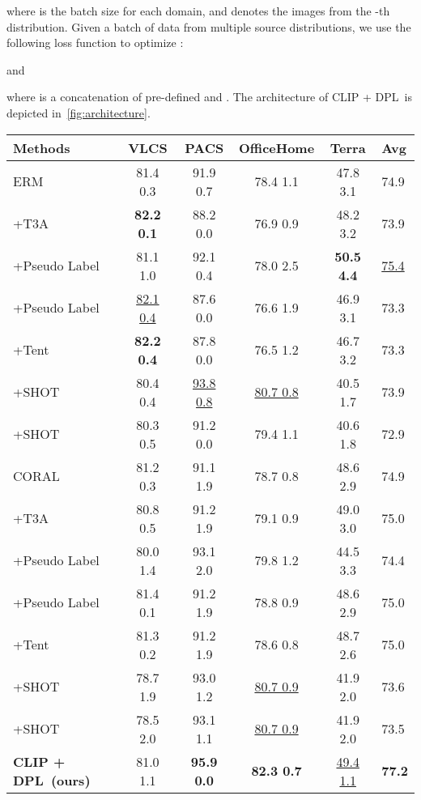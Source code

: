\documentclass[letterpaper]{article} \usepackage[]{aaai23}
\newcommand{\dplshort}{DPL}
\begin{document}
where  is the batch size for each domain, and  denotes the images from the -th distribution. 
Given a batch of data from multiple source distributions, we use the following loss function to optimize :

and 

where   is a concatenation of pre-defined  and  . 
The architecture of CLIP + \dplshort~is depicted in~\autoref{fig:architecture}.

\begin{table*}[t]
\begin{center}
\begin{tabular}{l|cccc|l}
\toprule
\textbf{Methods} & \textbf{VLCS} & \textbf{PACS} & \textbf{OfficeHome} & \textbf{Terra} & \textbf{Avg} \\
\midrule
ERM & 81.4  0.3 & 91.9  0.7 & 78.4  1.1 & 47.8  3.1 & 74.9 \\
+T3A & \textbf{82.2  0.1} & 88.2  0.0 & 76.9  0.9 & 48.2  3.2 & 73.9 \\
+Pseudo Label   & 81.1  1.0 & 92.1  0.4 & 78.0  2.5 & \textbf{50.5  4.4} & \underline{75.4} \\
+Pseudo Label & \underline{82.1  0.4} & 87.6  0.0 & 76.6  1.9 & 46.9  3.1 & 73.3 \\
+Tent & \textbf{82.2  0.4} & 87.8  0.0 & 76.5  1.2 & 46.7  3.2 & 73.3 \\
+SHOT & 80.4  0.4 & \underline{93.8  0.8} & \underline{80.7  0.8} & 40.5  1.7 & 73.9 \\
+SHOT & 80.3  0.5 & 91.2  0.0 & 79.4  1.1 & 40.6  1.8 & 72.9 \\
\midrule
CORAL & 81.2  0.3 & 91.1  1.9 & 78.7  0.8 & 48.6  2.9 & 74.9 \\
+T3A & 80.8  0.5 & 91.2  1.9 & 79.1  0.9 & 49.0  3.0 & 75.0 \\
+Pseudo Label  & 80.0  1.4 & 93.1  2.0 & 79.8  1.2 & 44.5  3.3 & 74.4 \\
+Pseudo Label & 81.4  0.1 & 91.2  1.9 & 78.8  0.9 & 48.6  2.9 & 75.0           \\
+Tent & 81.3  0.2 & 91.2  1.9 & 78.6  0.8 & 48.7  2.6 & 75.0           \\
+SHOT & 78.7  1.9 & 93.0  1.2 & \underline{80.7  0.9} & 41.9  2.0 & 73.6\\
+SHOT & 78.5  2.0 & 93.1  1.1 & \underline{80.7  0.9} & 41.9  2.0 & 73.5 \\
\midrule
\textbf{CLIP + \dplshort~(ours)}& 81.0  1.1 & \textbf{95.9  0.0} & \textbf{82.3  0.7} & \underline{49.4  1.1} & \textbf{77.2}           \\
\bottomrule
\end{tabular}
\end{center}
\caption{
Comparison with TTA methods.
Here,  indicates updating the linear classifier, and  indicates updating the feature extractor to minimize entropy reported in table 3 of the T3A paper.
The best results are in bold, and second-best results are underlined.
All the experiments listed in this table are run on a cluster of A100 GPUs.
The numbers of ERM, CORAL, and CLIP + \dplshort~are different from \autoref{table:main_dg} because of the use of half precision floating point on A100.
}
\label{table:main_tta}
\end{table*}
\end{document}
